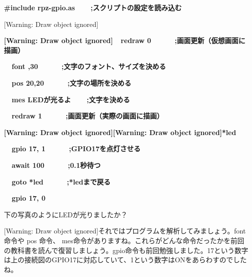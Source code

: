 \documentclass[a4paper,dvipdfmx]{jarticle}
\begin{document}
{\ttfamily\bfseries
\#include
{\textquotedbl}rpz-gpio.as{\textquotedbl}\ \ \ \ \textcolor[rgb]{0.0,0.0,0.8}{;スクリプトの設定を読み込む}}

[Warning: Draw object ignored]

{\ttfamily\bfseries
[Warning: Draw object ignored]\ \ redraw
0\ \ \ \ \ \ \textcolor[rgb]{0.0,0.0,0.8}{;画面更新（仮想画面に描画）}}

{\ttfamily\bfseries
\ \ font
{\textquotedbl}{\textquotedbl},30\ \ \ \ \ \ \textcolor[rgb]{0.0,0.0,0.8}{;文字のフォント、サイズを決める}}

{\ttfamily\bfseries
\ \ pos 20,20\ \ \ \ \ \ \textcolor[rgb]{0.0,0.0,0.8}{;文字の場所を決める}}

{\ttfamily\bfseries
\ \ mes
{\textquotedbl}LEDが光るよ{\textquotedbl}\ \ \ \ \textcolor[rgb]{0.0,0.0,0.8}{;文字を決める}}

{\ttfamily\bfseries
\ \ redraw
1\ \ \ \ \ \ \textcolor[rgb]{0.0,0.0,0.8}{;画面更新（実際の画面に描画）}}


\bigskip

{\ttfamily\bfseries
[Warning: Draw object ignored][Warning: Draw object ignored]*led}

{\ttfamily\bfseries
\ \ gpio 17, 1\ \ \ \ \ \ \textcolor[rgb]{0.0,0.0,0.8}{;GPIO17を点灯させる}}

{\ttfamily\bfseries
\ \ await 100\ \ \ \ \ \ \textcolor[rgb]{0.0,0.0,0.8}{;0.1秒待つ}}

{\ttfamily\bfseries
\ \ goto *led\ \ \ \ \ \ \textcolor[rgb]{0.0,0.0,0.8}{;*ledまで戻る}}


\bigskip

{\ttfamily\bfseries
\ \ gpio 17, 0}


\bigskip

下の写真のようにLEDが光りましたか？


\bigskip

[Warning: Draw object
ignored]それではプログラムを解析してみましょう。font
命令や pos 命令、
mes命令がありますね。これらがどんな命令だったかを前回の教科書を読んで復習しましょう。gpio命令も前回勉強しました。17という数字は上の接続図のGPIO17に対応していて、1という数字はONをあらわすのでしたね。
\end{document}
